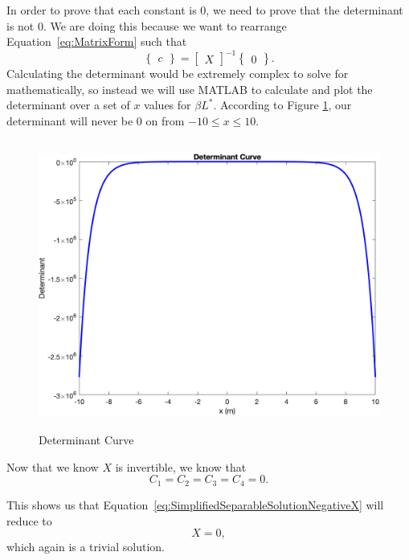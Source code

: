 \documentclass[12pt]{article}
\begin{document}
In order to prove that each constant is 0, we need to prove that the determinant is not 0. We are doing this because we want to rearrange Equation~\eqref{eq:MatrixForm} such that
\begin{equation}\label{eq:InvertibleMatrixForm}
    \begin{Bmatrix}
    c
    \end{Bmatrix}
    =
    \begin{bmatrix}
    X
    \end{bmatrix}^{-1}
    \begin{Bmatrix}
    0
    \end{Bmatrix}.
\end{equation}
Calculating the determinant would be extremely complex to solve for mathematically, so instead we will use MATLAB to calculate and plot the determinant over a set of $x$ values for $\beta L^*$. According to Figure \ref{DeterminantCurve}, our determinant will never be 0 on from $-10\leq x\leq 10$.
\begin{figure}[H]
\centering
\includegraphics[height= 9.5cm, width= 12.5cm]{curve_Determinant.png}
\caption{Determinant Curve}
\label{DeterminantCurve}
\end{figure}
Now that we know $X$ is invertible, we know that
\begin{equation}\label{eq:ConstantsAllEqualToZero}
    C_1=C_2=C_3=C_4=0.
\end{equation}

This shows us that Equation~\eqref{eq:SimplifiedSeparableSolutionNegativeX} will reduce to
\begin{equation}\label{eq:X=0}
    X=0,
\end{equation}
which again is a trivial solution.
\end{document}
